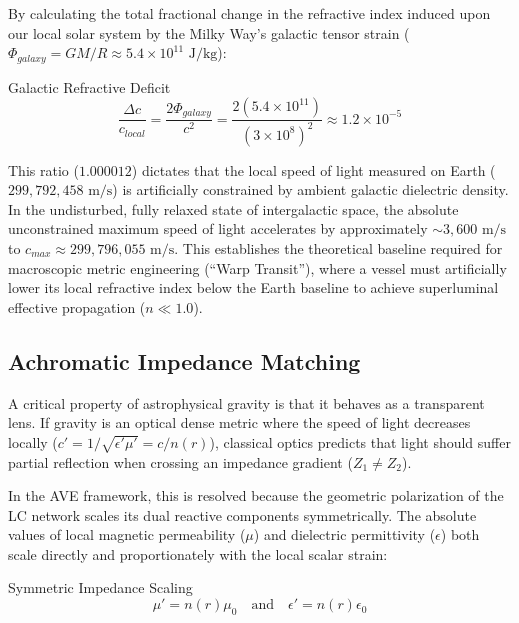 By calculating the total fractional change in the refractive index induced upon our local solar system by the Milky Way's galactic tensor strain ($\Phi_{galaxy} = GM/R \approx 5.4 \times 10^{11} \text{ J/kg}$):
\begin{resultbox}{Galactic Refractive Deficit}
\begin{equation}
    \frac{\Delta c}{c_{local}} = \frac{2\Phi_{galaxy}}{c^2} = \frac{2(5.4 \times 10^{11})}{(3 \times 10^8)^2} \approx 1.2 \times 10^{-5}
\end{equation}
\end{resultbox}

This ratio ($1.000012$) dictates that the local speed of light measured on Earth ($299,792,458 \text{ m/s}$) is artificially constrained by ambient galactic dielectric density. In the undisturbed, fully relaxed state of intergalactic space, the absolute unconstrained maximum speed of light accelerates by approximately $\sim 3,600 \text{ m/s}$ to $c_{max} \approx 299,796,055 \text{ m/s}$. This establishes the theoretical baseline required for macroscopic metric engineering (``Warp Transit''), where a vessel must artificially lower its local refractive index below the Earth baseline to achieve superluminal effective propagation ($n \ll 1.0$).

\subsection{Achromatic Impedance Matching}
\label{sec:achromatic_matching}
A critical property of astrophysical gravity is that it behaves as a transparent lens. If gravity is an optical dense metric where the speed of light decreases locally ($c' = 1/\sqrt{\epsilon' \mu'} = c/n(r)$), classical optics predicts that light should suffer partial reflection when crossing an impedance gradient ($Z_1 \neq Z_2$). 

In the AVE framework, this is resolved because the geometric polarization of the LC network scales its dual reactive components symmetrically. The absolute values of local magnetic permeability ($\mu$) and dielectric permittivity ($\epsilon$) both scale directly and proportionately with the local scalar strain: 
\begin{resultbox}{Symmetric Impedance Scaling}
\begin{equation}
    \mu' = n(r)\mu_0 \quad \text{and} \quad \epsilon' = n(r)\epsilon_0
\end{equation}
\end{resultbox}

